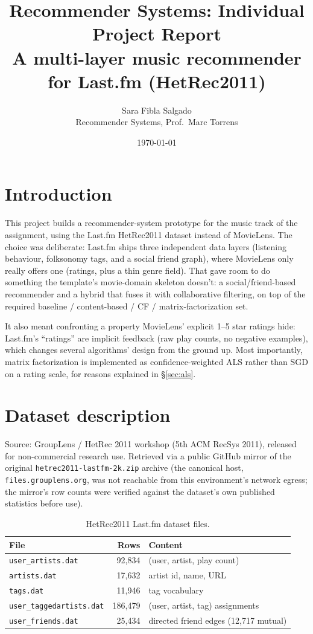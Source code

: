 \documentclass[11pt,a4paper]{article}
\title{Recommender Systems: Individual Project Report\\[0.3em]
\Large A multi-layer music recommender for Last.fm (HetRec2011)}
\author{Sara Fibla Salgado\\[0.2em]\normalsize Recommender Systems, Prof.\ Marc Torrens}
\date{\today}
\newcommand{\code}[1]{\texttt{#1}}
\newcommand{\secref}[1]{\S\ref{#1}}
\begin{document}
\maketitle

\section{Introduction}
\label{sec:intro}

This project builds a recommender-system prototype for the music track of the assignment, using the Last.fm HetRec2011 dataset instead of MovieLens. The choice was deliberate: Last.fm ships three independent data layers (listening behaviour, folksonomy tags, and a social friend graph), where MovieLens only really offers one (ratings, plus a thin genre field). That gave room to do something the template's movie-domain skeleton doesn't: a social/friend-based recommender and a hybrid that fuses it with collaborative filtering, on top of the required baseline / content-based / CF / matrix-factorization set.

It also meant confronting a property MovieLens' explicit 1--5 star ratings hide: Last.fm's ``ratings'' are implicit feedback (raw play counts, no negative examples), which changes several algorithms' design from the ground up. Most importantly, matrix factorization is implemented as confidence-weighted ALS rather than SGD on a rating scale, for reasons explained in \secref{sec:als}.

\section{Dataset description}
\label{sec:dataset}

Source: GroupLens / HetRec 2011 workshop (5th ACM RecSys 2011), released for non-commercial research use. Retrieved via a public GitHub mirror of the original \code{hetrec2011-lastfm-2k.zip} archive (the canonical host, \code{files.grouplens.org}, was not reachable from this environment's network egress; the mirror's row counts were verified against the dataset's own published statistics before use).

\begin{table}[!htbp]
\centering
\begin{tabular}{lrl}
\toprule
File & Rows & Content \\
\midrule
\code{user\_artists.dat} & 92{,}834 & (user, artist, play count) \\
\code{artists.dat} & 17{,}632 & artist id, name, URL \\
\code{tags.dat} & 11{,}946 & tag vocabulary \\
\code{user\_taggedartists.dat} & 186{,}479 & (user, artist, tag) assignments \\
\code{user\_friends.dat} & 25{,}434 & directed friend edges (12{,}717 mutual) \\
\bottomrule
\end{tabular}
\caption{HetRec2011 Last.fm dataset files.}
\end{table}
\end{document}
